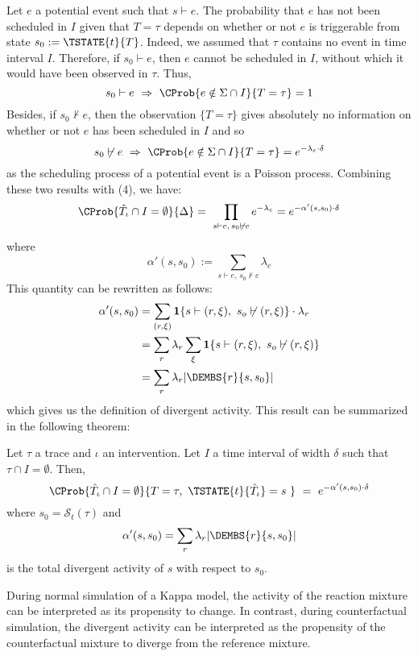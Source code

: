 Let $e$ a potential event such that $s \vdash e$. The probability that
$e$ has not been scheduled in $I$ given that $T=\tau$ depends on
whether or not $e$ is triggerable from state $s_0 :=
\TSTATE{t}{T}$. Indeed, we assumed that $\tau$ contains no event in
time interval $I$. Therefore, if $s_0 \vdash e$, then $e$ cannot be
scheduled in $I$, without which it would have been observed in $\tau$.
Thus,
\[ s_0 \vdash e \ \Rightarrow\ \CProb{e \notin \Sigma \cap I}{ T=\tau
  } = 1 \] Besides, if $s_0 \not\vdash e$, then the observation
$\{ T=\tau \}$ gives absolutely no information on whether or not $e$
has been scheduled in $I$ and so
\[ s_0 \not\vdash e \ \Rightarrow\ \CProb{e \notin \Sigma \cap I}{
    T=\tau } = e^{-\lambda_e \cdot \delta} \] as the scheduling
process of a potential event is a Poisson process. Combining these two
results with (4), we have:
\begin{align}
  \CProb{ \hat T_\iota \cap I = \emptyset }{ \Delta }
  =\ \prod_{s \vdash e, \, s_0 \not\vdash e} e^{-\lambda_e} = e^{-\alpha'(s, s_0)\cdot\delta}
\end{align}
where
\[\alpha'(s, s_0) := \sum_{s \vdash e, \, s_0 \not\vdash e}
  \lambda_e \] This quantity can be rewritten as follows:
\begin{align}
  \alpha'(s, s_0) &= 
                    \sum_{(r, \xi)} \textbf{1}\{ s \vdash (r, \xi),\ s_o \not\vdash (r, \xi) \}\cdot\lambda_r \\
                  &= \sum_r \lambda_r\sum_\xi \textbf{1}\{ s \vdash (r, \xi),\ s_o \not\vdash (r, \xi) \} \\
                  &= \sum_r \lambda_r |\DEMBS{r}{s, s_0}|
\end{align}
which gives us the definition of divergent activity. This result can
be summarized in the following theorem:
\begin{theorem} Let $\tau$ a trace and $\iota$ an intervention. Let
  $I$ a time interval of width $\delta$ such that
  $\tau \cap I = \emptyset$. Then,
  \[\CProb{ \hat T_\iota \cap I = \emptyset }{ T=\tau,\
      \TSTATE{t}{\hat T_\iota} = s\ }
    \ =\ e^{-\alpha'(s, s_0) \cdot \delta}
  \]
  where $s_0 = \mathcal{S}_t(\tau)$ and
  \[\alpha'(s, s_0) = \sum_r \lambda_r |\DEMBS{r}{s, s_0}| \]
  is the total divergent activity of $s$ with respect to $s_0$.
\end{theorem}
During normal simulation of a Kappa model, the activity of the
reaction mixture can be interpreted as its propensity to change. In
contrast, during counterfactual simulation, the divergent activity can
be interpreted as the propensity of the counterfactual mixture to
diverge from the reference mixture.






